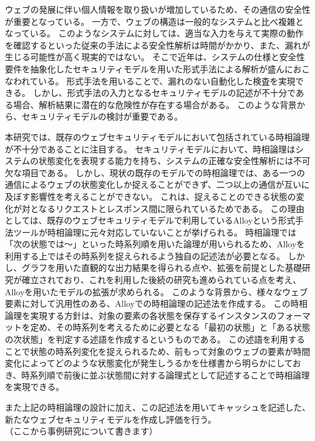 \documentclass[12pt,a4paper]{jbook}
\begin{document}
ウェブの発展に伴い個人情報を取り扱いが増加しているため、その通信の安全性が重要となっている。
一方で、ウェブの構造は一般的なシステムと比べ複雑となっている。
このようなシステムに対しては、適当な入力を与えて実際の動作を確認するといった従来の手法による安全性解析は時間がかかり、また、漏れが生じる可能性が高く現実的ではない。
そこで近年は、システムの仕様と安全性要件を抽象化したセキュリティモデルを用いた形式手法による解析が盛んにおこなわれている。
形式手法を用いることで、漏れのない自動化した検査を実現できる。
しかし、形式手法の入力となるセキュリティモデルの記述が不十分である場合、解析結果に潜在的な危険性が存在する場合がある。
このような背景から、セキュリティモデルの検討が重要である。

本研究では、既存のウェブセキュリティモデルにおいて包括されている時相論理が不十分であることに注目する。
セキュリティモデルにおいて、時相論理はシステムの状態変化を表現する能力を持ち、システムの正確な安全性解析には不可欠な項目である。
しかし、現状の既存のモデルでの時相論理では、ある一つの通信によるウェブの状態変化しか捉えることができず、二つ以上の通信が互いに及ぼす影響性を考えることができない。
これは、捉えることのできる状態の変化が対となるリクエストとレスポンス間に限られているためである。
この理由としては、既存のウェブセキュリティモデルで利用しているAlloyという形式手法ツールが時相論理に元々対応していないことが挙げられる。
時相論理では「次の状態では～」といった時系列順を用いた論理が用いられるため、Alloyを利用する上ではその時系列を捉えられるよう独自の記述法が必要となる。
しかし、グラフを用いた直観的な出力結果を得られる点や、拡張を前提とした基礎研究が確立されており、これを利用した後続の研究も進められている点を考え、Alloyを用いたモデルの拡張が求められる。
このような背景から、様々なウェブ要素に対して汎用性のある、Alloyでの時相論理の記述法を作成する。
この時相論理を実現する方針は、対象の要素の各状態を保存するインスタンスのフォーマットを定め、その時系列を考えるために必要となる「最初の状態」と「ある状態の次状態」を判定する述語を作成するというものである。
この述語を利用することで状態の時系列変化を捉えられるため、前もって対象のウェブの要素が時間変化によってどのような状態変化が発生しうるかを仕様書から明らかにしておき、時系列順で前後に並ぶ状態間に対する論理式として記述することで時相論理を実現できる。

また上記の時相論理の設計に加え、この記述法を用いてキャッシュを記述した、新たなウェブセキュリティモデルを作成し評価を行う。
\\（ここから事例研究について書きます）
\end{document}
